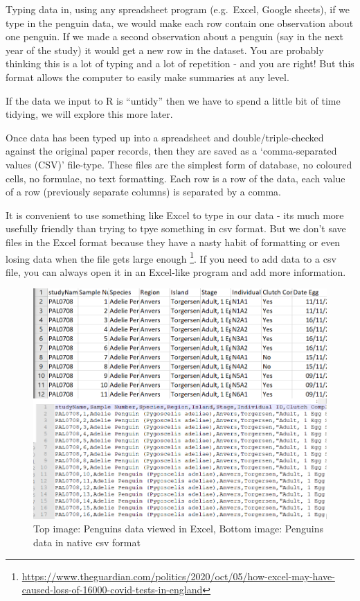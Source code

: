 \documentclass[
]{book}
\begin{document}
Typing data in, using any spreadsheet program (e.g.~Excel, Google sheets), if we type in the penguin data, we would make each row contain one observation about one penguin. If we made a second observation about a penguin (say in the next year of the study) it would get a new row in the dataset. You are probably thinking this is a lot of typing and a lot of repetition - and you are right! But this format allows the computer to easily make summaries at any level.

If the data we input to R is ``untidy'' then we have to spend a little bit of time tidying, we will explore this more later.

Once data has been typed up into a spreadsheet and double/triple-checked against the original paper records, then they are saved as a `comma-separated values (CSV)' file-type. These files are the simplest form of database, no coloured cells, no formulae, no text formatting. Each row is a row of the data, each value of a row (previously separate columns) is separated by a comma.

It is convenient to use something like Excel to type in our data - its much more usefully friendly than trying to tpye something in csv format. But we don't save files in the Excel format because they have a nasty habit of formatting or even losing data when the file gets large enough \footnote{\url{https://www.theguardian.com/politics/2020/oct/05/how-excel-may-have-caused-loss-of-16000-covid-tests-in-england}}.
If you need to add data to a csv file, you can always open it in an Excel-like program and add more information.

\begin{figure}
\includegraphics[width=0.8\linewidth]{images/excel_csv} \caption{Top image: Penguins data viewed in Excel, Bottom image: Penguins data in native csv format}\label{fig:unnamed-chunk-45}
\end{figure}
\end{document}
